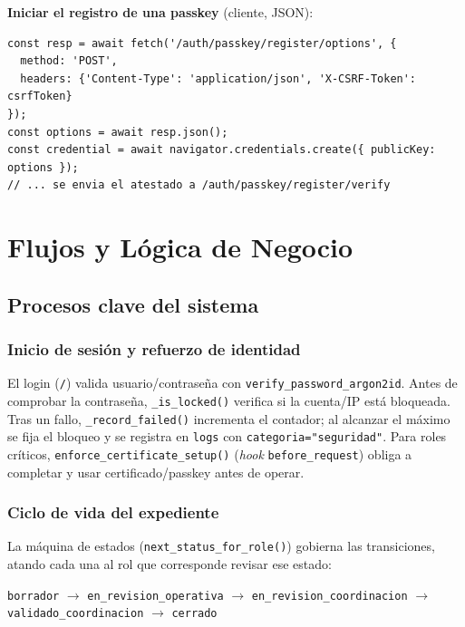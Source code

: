 \documentclass[10pt,letterpaper]{report}
\begin{document}
\textbf{Iniciar el registro de una passkey} (cliente, JSON):
\begin{lstlisting}[style=plain]
const resp = await fetch('/auth/passkey/register/options', {
  method: 'POST',
  headers: {'Content-Type': 'application/json', 'X-CSRF-Token': csrfToken}
});
const options = await resp.json();
const credential = await navigator.credentials.create({ publicKey: options });
// ... se envia el atestado a /auth/passkey/register/verify
\end{lstlisting}

\chapter{Flujos y L\'ogica de Negocio}

\section{Procesos clave del sistema}

\subsection*{Inicio de sesi\'on y refuerzo de identidad}
El login (\texttt{/}) valida usuario/contrase\~na con \texttt{verify\_password\_argon2id}. Antes de
comprobar la contrase\~na, \texttt{\_is\_locked()} verifica si la cuenta/IP est\'a bloqueada. Tras un
fallo, \texttt{\_record\_failed()} incrementa el contador; al alcanzar el m\'aximo se fija el bloqueo y
se registra en \texttt{logs} con \texttt{categoria="seguridad"}. Para roles cr\'iticos,
\texttt{enforce\_certificate\_setup()} (\emph{hook} \texttt{before\_request}) obliga a completar y usar
certificado/passkey antes de operar.

\subsection*{Ciclo de vida del expediente}
La m\'aquina de estados (\texttt{next\_status\_for\_role()}) gobierna las transiciones, atando cada
una al rol que corresponde revisar ese estado:
\begin{center}
\texttt{borrador} $\rightarrow$ \texttt{en\_revision\_operativa} $\rightarrow$
\texttt{en\_revision\_coordinacion} $\rightarrow$ \texttt{validado\_coordinacion} $\rightarrow$
\texttt{cerrado}
\end{center}
\end{document}
